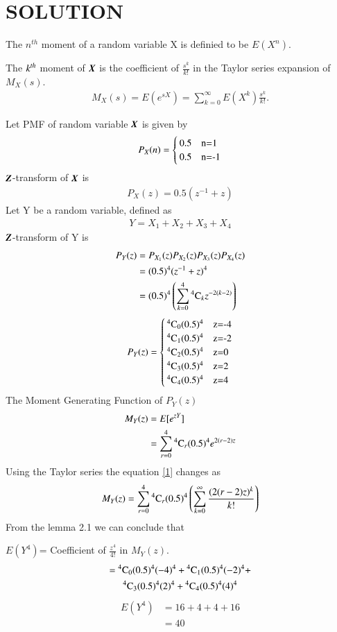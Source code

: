 \documentclass[journal,12pt,twocolumn]{IEEEtran}
\begin{document}
\section{SOLUTION}
\begin{definition}
The $n^{th}$ moment of a random variable X is definied to be $E(X^{n})$.
\end{definition}
\begin{lemma}
The $\emph{k}^{th}$ moment of $\textbf{\emph{X}}$ is the coefficient of $\frac{s^{k}}{k!}$ in the Taylor series expansion of $M_{X}(s)$.
\begin{align}
    M_{X}(s)=E(e^{sX})=\sum_{k=0}^{\infty}E(X^{k})\frac{s^{k}}{k!}.
\end{align}
\end{lemma}
Let PMF of random variable $\textbf{\emph{X}}$ is given by
\begin{align}
P_{X}(n)=
\begin{cases}
0.5 & $n=1$\\
0.5 & $n=-1$
\end{cases}
\end{align}
$\textbf{\emph{Z}}$-transform of $\textbf{\emph{X}}$ is
\begin{align}
P_{X}(z)= 0.5(z^{-1}+z)
\end{align}
Let Y be a random variable, defined as
\begin{align}
    Y=X_{1}+X_{2}+X_{3}+X_{4}
\end{align}
$\textbf{\emph{Z}}$-transform of Y is 
\begin{align}
P_{Y}(z)
         &= P_{X_{1}}(z)P_{X_{2}}(z)P_{X_{3}}(z)P_{X_{4}}(z)\\
         &= (0.5)^{4}(z^{-1}+z)^{4}\\
         &= (0.5)^{4}\left(\sum_{k=0}^{4}{}^{4}\mathrm{C}_{k}z^{-2(k-2)} \right)
\end{align}
\begin{align}
    P_{Y}(z)=
    \begin{cases}
    \comb{4}{0}(0.5)^{4} & $z=-4$\\
    \comb{4}{1}(0.5)^{4} & $z=-2$\\
    \comb{4}{2}(0.5)^{4} & $z=0$\\
    \comb{4}{3}(0.5)^{4} & $z=2$\\
    \comb{4}{4}(0.5)^{4} & $z=4$
    \end{cases}
\end{align}
The Moment Generating Function of $P_{Y}(z)$ 
\begin{align}
    M_{Y}(z) &=E[e^{zY}]\\
             &= \sum_{r=0}^{4}{}^{4}\mathrm{C}_{r}(0.5)^{4}e^{2(r-2)z}\label{1}
\end{align}
Using the Taylor series the equation \ref{1} changes as
\begin{align}
     M_{Y}(z)= \sum_{r=0}^{4}{}^{4}\mathrm{C}_{r}(0.5)^{4}\left(\sum_{k=0}^{\infty}\frac{(2(r-2)z)^{k}}{k!}\right)
\end{align}
From the lemma 2.1 we can conclude that

 $ E(Y^{4})$= Coefficient of $\frac{z^{4}}{4!}$ in $M_{Y}(z)$.
 \begin{multline}
   = {}^{4}\mathrm{C}_{0}(0.5)^{4}(-4)^{4}+{}^{4}\mathrm{C}_{1}(0.5)^{4}(-2)^{4}+\\ {}^{4}\mathrm{C}_{3}(0.5)^{4}(2)^{4}+ {}^{4}\mathrm{C}_{4} (0.5)^{4}(4)^{4}
 \end{multline} 
 \begin{align}
E(Y^{4})&=16+4+4+16\\
&=40
\end{align}
\end{document}
